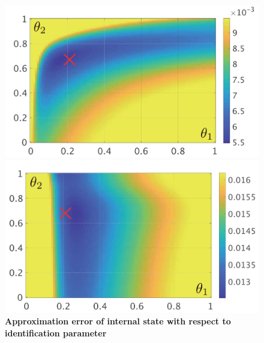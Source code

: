 \documentclass[tombow,dvipdfmx]{corona-a5-1.1}
\begin{document}
\begin{figure}[t!]
  \centering
  {
  \begin{minipage}{0.49\linewidth}
    \centering
    \includegraphics[width = 1\linewidth]{figs/heatdelta}
    \medskip
  \end{minipage}
  \begin{minipage}{0.49\linewidth}
    \centering
    \includegraphics[width = 1\linewidth]{figs/heatE}
    \medskip
  \end{minipage}
}
 \caption{\textbf{Approximation error of internal state with respect to identification parameter}}
 \label{fig:datamodeling}
\medskip
\end{figure}
\end{document}
